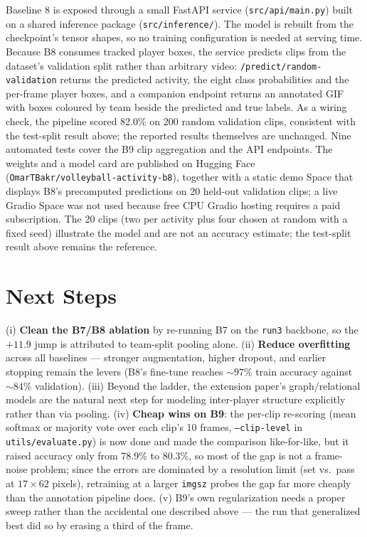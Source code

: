 \documentclass[9pt,a4paper,twocolumn,twoside]{tau-class/tau}
\begin{document}
Baseline 8 is exposed through a small FastAPI service (\texttt{src/api/main.py}) built on a shared inference package (\texttt{src/inference/}). The model is rebuilt from the checkpoint's tensor shapes, so no training configuration is needed at serving time. Because B8 consumes tracked player boxes, the service predicts clips from the dataset's validation split rather than arbitrary video: \texttt{/predict/random-validation} returns the predicted activity, the eight class probabilities and the per-frame player boxes, and a companion endpoint returns an annotated GIF with boxes coloured by team beside the predicted and true labels. As a wiring check, the pipeline scored 82.0\% on 200 random validation clips, consistent with the test-split result above; the reported results themselves are unchanged. Nine automated tests cover the B9 clip aggregation and the API endpoints. The weights and a model card are published on Hugging Face (\texttt{OmarTBakr/volleyball-activity-b8}), together with a static demo Space that displays B8's precomputed predictions on 20 held-out validation clips; a live Gradio Space was not used because free CPU Gradio hosting requires a paid subscription. The 20 clips (two per activity plus four chosen at random with a fixed seed) illustrate the model and are not an accuracy estimate; the test-split result above remains the reference.

\section{Next Steps}

(i) \textbf{Clean the B7/B8 ablation} by re-running B7 on the \texttt{run3} backbone, so the $+11.9$ jump is attributed to team-split pooling alone. (ii) \textbf{Reduce overfitting} across all baselines --- stronger augmentation, higher dropout, and earlier stopping remain the levers (B8's fine-tune reaches ${\sim}97\%$ train accuracy against ${\sim}84\%$ validation). (iii) Beyond the ladder, the extension paper's graph/relational models are the natural next step for modeling inter-player structure explicitly rather than via pooling. (iv) \textbf{Cheap wins on B9}: the per-clip re-scoring (mean softmax or majority vote over each clip's 10 frames, \texttt{--clip-level} in \texttt{utils/evaluate.py}) is now done and made the comparison like-for-like, but it raised accuracy only from 78.9\% to 80.3\%, so most of the gap is not a frame-noise problem; since the errors are dominated by a resolution limit (set vs.\ pass at $17\times62$ pixels), retraining at a larger \texttt{imgsz} probes the gap far more cheaply than the annotation pipeline does. (v) B9's own regularization needs a proper sweep rather than the accidental one described above --- the run that generalized best did so by erasing a third of the frame.

\end{document}
